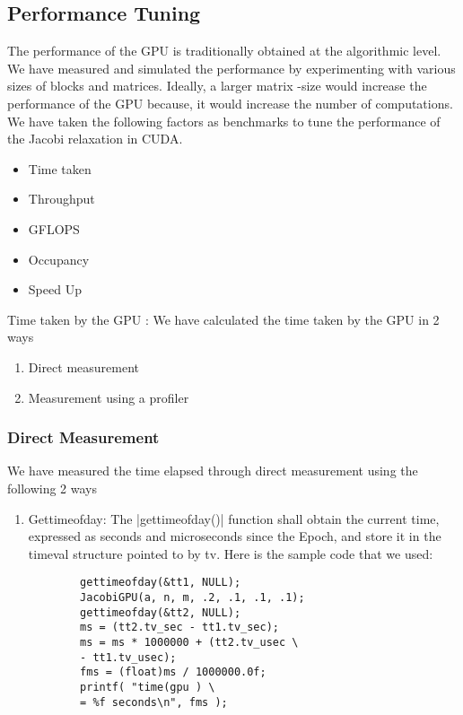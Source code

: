 \documentclass[10pt]{article}
\begin{document}
\begin{multicols}{2}
  \subsection{Performance Tuning}
  The performance of the GPU is traditionally obtained at the algorithmic level.
  We have measured and simulated the performance by experimenting with various sizes of blocks and matrices.
  Ideally, a larger matrix -size would increase the performance of the GPU because,  it would increase  the  number of computations.
  We have taken the following factors as benchmarks to tune the performance of the Jacobi relaxation in CUDA.
  \begin{itemize}
    \item Time taken
    \item Throughput
    \item GFLOPS
    \item Occupancy
    \item Speed Up
  \end{itemize}
  Time taken by the GPU  : We have calculated the time taken by the GPU in 2 ways
  \begin{enumerate}
    \item Direct measurement
    \item Measurement using a profiler
  \end{enumerate}

  \subsubsection{Direct Measurement} 
  We have measured the time elapsed through direct measurement using the following 2 ways
  \begin{enumerate}
    \item Gettimeofday: The |gettimeofday()| function shall obtain the current time, expressed as seconds and microseconds since the Epoch, and store it in the timeval structure pointed to by tv.
      Here is the sample code that we used:

      \begin{verbatim}
        gettimeofday(&tt1, NULL);
        JacobiGPU(a, n, m, .2, .1, .1, .1);
        gettimeofday(&tt2, NULL);
        ms = (tt2.tv_sec - tt1.tv_sec);
        ms = ms * 1000000 + (tt2.tv_usec \
        - tt1.tv_usec);
        fms = (float)ms / 1000000.0f;
        printf( "time(gpu ) \
        = %f seconds\n", fms );
      \end{verbatim}


\end{enumerate}
\end{multicols}
\end{document}
